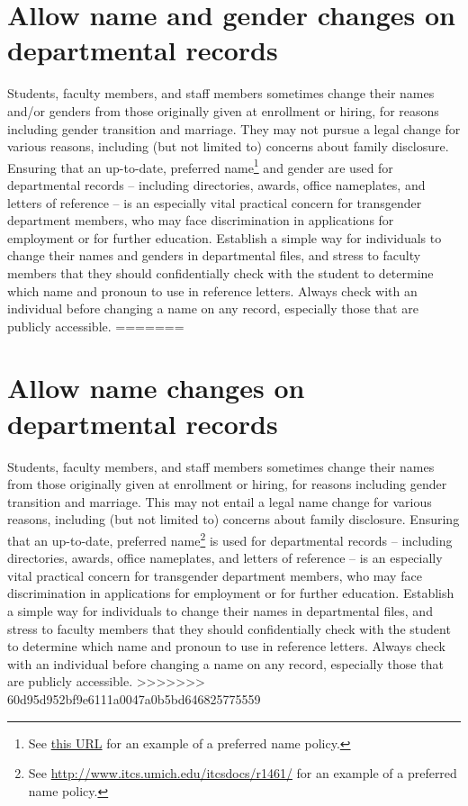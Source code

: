 \section {Allow name and gender changes on departmental records}
\label{name-changes}
Students, faculty members, and staff members sometimes change their names and/or genders from those originally given at enrollment or hiring, for reasons including gender transition and marriage. They may not pursue a legal change for various reasons, including (but not limited to) concerns about family disclosure. Ensuring that an up-to-date, preferred name\footnote{See \href{http://www.itcs.umich.edu/itcsdocs/r1461/}{this URL} for an example of a preferred name policy.} and gender are used for departmental records -- including directories, awards, office nameplates, and letters of reference -- is an especially vital practical concern for transgender department members, who may face discrimination in applications for employment or for further education. Establish a simple way for individuals to change their names and genders in departmental files, and stress to faculty members that they should confidentially check with the student to determine which name and pronoun to use in reference letters. Always check with an individual before changing a name on any record, especially those that are publicly accessible.
=======
\section {Allow name changes on departmental records}
\label{name-changes}
Students, faculty members, and staff members sometimes change their names from those originally given at enrollment or hiring, for reasons including gender transition and marriage. This may not entail a legal name change for various reasons, including (but not limited to) concerns about family disclosure. Ensuring that an up-to-date, preferred name\footnote{See \href{http://www.itcs.umich.edu/itcsdocs/r1461/}{http://www.itcs.umich.edu/itcsdocs/r1461/} for an example of a preferred name policy.} is used for departmental records -- including directories, awards, office nameplates, and letters of reference -- is an especially vital practical concern for transgender department members, who may face discrimination in applications for employment or for further education. Establish a simple way for individuals to change their names in departmental files, and stress to faculty members that they should confidentially check with the student to determine which name and pronoun to use in reference letters. Always check with an individual before changing a name on any record, especially those that are publicly accessible.
>>>>>>> 60d95d952bf9e6111a0047a0b5bd646825775559


